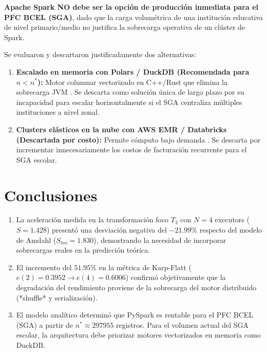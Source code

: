 \documentclass[11pt,a4paper]{article}
\begin{document}
\textbf{Apache Spark NO debe ser la opción de producción inmediata para el PFC BCEL (SGA)}, dado que la carga volumétrica de una institución educativa de nivel primario/medio no justifica la sobrecarga operativa de un clúster de Spark.

Se evaluaron y descartaron justificadamente dos alternativas:
\begin{enumerate}
    \item \textbf{Escalado en memoria con Polars / DuckDB (Recomendada para $n < n^*$):} Motor columnar vectorizado en C++/Rust que elimina la sobrecarga JVM \cite{raasveldt2019duckdb}. Se descarta como solución única de largo plazo por su incapacidad para escalar horizontalmente si el SGA centraliza múltiples instituciones a nivel zonal.
    \item \textbf{Clusters elásticos en la nube con AWS EMR / Databricks (Descartada por costo):} Permite cómputo bajo demanda \cite{armbrust2010cloud}. Se descarta por incrementar innecesariamente los costos de facturación recurrente para el SGA escolar.
\end{enumerate}

\section{Conclusiones}

\begin{enumerate}
    \item La aceleración medida en la transformación foco $T_3$ con $N=4$ executors ($S = \num{1.428}$) presentó una desviación negativa del $-21.99\%$ respecto del modelo de Amdahl ($S_{\text{teo}} = \num{1.830}$), demostrando la necesidad de incorporar sobrecargas reales en la predicción teórica.
    \item El incremento del $51.95\%$ en la métrica de Karp-Flatt ($e(2) = 0.3952 \to e(4) = 0.6006$) confirmó objetivamente que la degradación del rendimiento proviene de la sobrecarga del motor distribuido (*shuffle* y serialización).
    \item El modelo analítico determinó que PySpark es rentable para el PFC BCEL (SGA) a partir de $n^* \approx \num{297955}$ registros. Para el volumen actual del SGA escolar, la arquitectura debe priorizar motores vectorizados en memoria como DuckDB.
\end{enumerate}
\end{document}
